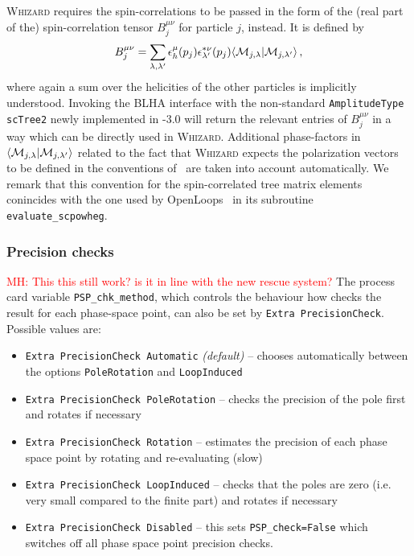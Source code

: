 \textsc{Whizard} requires the spin-correlations to be passed in the form of the (real  part of the) spin-correlation tensor $B_j^{\mu\nu}$ for particle $j$, instead. It is defined by
\begin{equation}
   B_j^{\mu\nu} = \sum_{\lambda,\lambda'}\epsilon_h^\mu(p_j)\epsilon_{\lambda'}^{*\nu}(p_j)\langle {\cal M}_{j,\lambda}|{\cal M}_{j,\lambda'}\rangle\,,
\end{equation}
where again a sum over the helicities of the other particles is implicitly understood. Invoking the BLHA interface with the non-standard \texttt{AmplitudeType scTree2} newly implemented in \gosam{}-3.0 will return the relevant entries of $B_j^{\mu\nu}$ in a way which can be directly used in \textsc{Whizard}. Additional phase-factors in $\langle {\cal M}_{j,\lambda}|{\cal M}_{j,\lambda'}\rangle$ related to the fact that \textsc{Whizard} expects the polarization vectors to be defined in the conventions of~\cite{Murayama:1992gi} are taken into account automatically. We remark that this convention for the spin-correlated tree matrix elements conincides with the one used by OpenLoops~\cite{Buccioni:2019sur} in its subroutine \texttt{evaluate\_scpowheg}.


\subsubsection{Precision checks}
\textcolor{red}{MH: This this still work? is it in line with the new rescue system?}
The \gosam{} process card variable \texttt{PSP\_chk\_method}, which controls the behaviour how \gosam{} checks the result for each phase-space point, can also be set by \lstinline[style=sh]|Extra PrecisionCheck|. Possible values are:
\begin{itemize}
	\item \texttt{Extra PrecisionCheck Automatic} \textit{(default)} -- chooses automatically between the options \texttt{PoleRotation} and \texttt{LoopInduced}
	\item \texttt{Extra PrecisionCheck PoleRotation} -- checks the precision of the pole first and rotates if necessary
	\item \texttt{Extra PrecisionCheck Rotation} -- estimates the precision of each phase space point by rotating and re-evaluating (slow)
	\item \texttt{Extra PrecisionCheck LoopInduced} -- checks that the poles are zero (i.e. very small compared to the finite part) and rotates if necessary
	\item \texttt{Extra PrecisionCheck Disabled}  -- this sets \texttt{PSP\_check=False} which switches off all phase space point precision checks.
\end{itemize}
